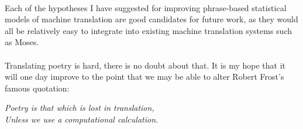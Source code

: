 \paragraph{}{Each of the hypotheses I have suggested for improving
  phrase-based statistical models of machine translation are good
  candidates for future work, as they would all be relatively easy to
  integrate into existing machine translation systems such as Moses.}
\paragraph{}{Translating poetry is hard, there is no doubt about
  that. It is my hope that it will one day improve to the point that
  we may be able to alter Robert Frost's famous quotation:\\}

  \begin{minipage}{\linewidth}
    \begin{flushright}
      {\it Poetry is that which is lost in translation, \\
        Unless we use a computational calculation.}
    \end{flushright}
    \end{minipage}


